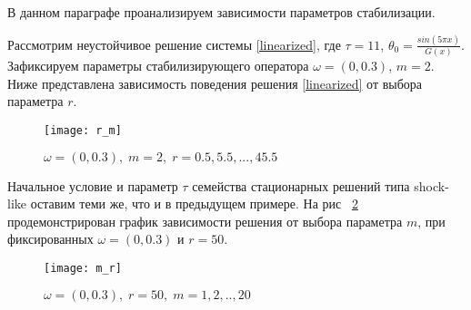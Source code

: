 В данном параграфе проанализируем зависимости параметров стабилизации.

\begin{exmp_stbur}
\end{exmp_stbur}

Рассмотрим неустойчивое решение системы \eqref{linearized}, где $\tau = 11$,
$\theta_0 = \frac{sin(5 \pi x)}{G(x)}$. Зафиксируем параметры стабилизирующего
оператора $\omega = (0, 0.3)$, $m = 2$. Ниже представлена зависимость
поведения решения \eqref{linearized} от выбора параметра $r$.

\begin{figure}[H]
 \centering
  \texttt{[image: r\_m]}
  \caption{$\omega = (0, 0.3), \; m = 2, \; r = 0.5, 5.5, ..., 45.5$}
  \label{fig:fig11}
\end{figure}

\begin{exmp_stbur}
\end{exmp_stbur}

Начальное условие и параметр $\tau$ семейства стационарных решений типа
shock-like оставим теми же, что и в предыдущем примере. На рис ~\ref{fig:fig12}
продемонстрирован график зависимости решения от выбора параметра $m$, при 
фиксированных $\omega = (0, 0.3)$ и $r = 50$.

\begin{figure}[H]
 \centering
  \texttt{[image: m\_r]}
  \caption{$\omega = (0, 0.3), \; r = 50, \; m = 1, 2, .., 20$}
  \label{fig:fig12}
\end{figure}
